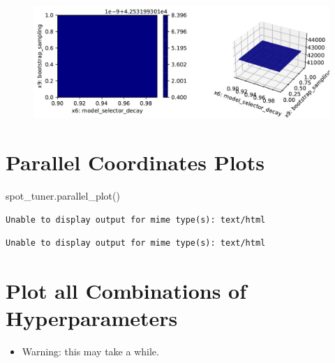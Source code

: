 \documentclass[
  letterpaper,
  DIV=11,
  numbers=noendperiod]{scrreprt}
\newenvironment{Shaded}{\begin{snugshade}}{\end{snugshade}}
\newcommand{\NormalTok}[1]{\textcolor[rgb]{0.00,0.23,0.31}{#1}}
\providecommand{\tightlist}{%
  \setlength{\itemsep}{0pt}\setlength{\parskip}{0pt}}\usepackage{longtable,booktabs,array}
\begin{document}
\begin{figure}[H]

{\centering \includegraphics{024_spot_hpt_river_friedman_hatr_files/figure-pdf/cell-44-output-4.pdf}

}

\end{figure}

\hypertarget{parallel-coordinates-plots}{%
\section{Parallel Coordinates Plots}\label{parallel-coordinates-plots}}

\begin{Shaded}
\begin{Highlighting}[]
\NormalTok{spot\_tuner.parallel\_plot()}
\end{Highlighting}
\end{Shaded}

\begin{verbatim}
Unable to display output for mime type(s): text/html
\end{verbatim}

\begin{verbatim}
Unable to display output for mime type(s): text/html
\end{verbatim}

\hypertarget{plot-all-combinations-of-hyperparameters-5}{%
\section{Plot all Combinations of
Hyperparameters}\label{plot-all-combinations-of-hyperparameters-5}}

\begin{itemize}
\tightlist
\item
  Warning: this may take a while.
\end{itemize}
\end{document}
